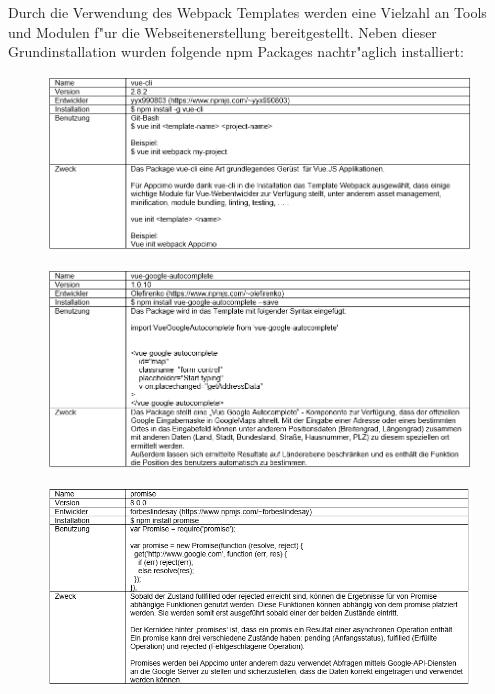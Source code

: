\documentclass[a4paper, 11pt]{scrreprt}
\begin{document}
Durch die Verwendung des Webpack Templates werden eine Vielzahl an Tools und Modulen f"ur die Webseitenerstellung bereitgestellt. Neben dieser Grundinstallation wurden folgende npm Packages nachtr"aglich installiert:

\begin{figure} [H]
\begin{center}
\includegraphics[scale=0.7]{package2.png}
\label{vue-cli}
\end{center}
\end{figure}



\begin{figure} [H]
\begin{center}
\includegraphics[scale=0.7]{package1.png}
\label{autocomplete}
\end{center}
\end{figure}


\begin{figure} [H]
\begin{center}
\includegraphics[scale=0.7]{package3.png}
\label{promise}
\end{center}
\end{figure}
\end{document}
